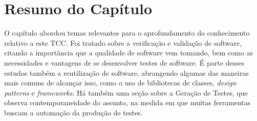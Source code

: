 \section{Resumo do Capítulo}
O capítulo abordou temas relevantes para o aprofundamento do conhecimento relativo a este TCC. Foi tratado sobre a verificação e validação de software, citando a importância que a qualidade de software vem tomando, bem como as necessidades e vantagens de se desenvolver testes de software. É parte desses estudos também a reutilização de software, abrangendo algumas das maneiras mais comuns de alcançar isso, como o uso de bibliotecas de classes, \textit{design patterns} e \textit{frameworks}. Há também uma seção sobre a Geração de Testes, que observa contemporaneidade do assunto, na medida em que muitas ferramentas buscam a automação da produção de testes.










